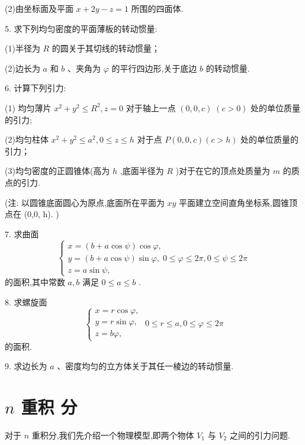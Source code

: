 (2)由坐标面及平面 \(x + {2y} - z = 1\) 所围的四面体.

5. 求下列均匀密度的平面薄板的转动惯量:

(1)半径为 \(R\) 的圆关于其切线的转动惯量；

(2)边长为 \(a\) 和 \(b\) 、夹角为 \(\varphi\) 的平行四边形,关于底边 \(b\) 的转动惯量.

6. 计算下列引力:

(1) 均匀薄片 \({x}^{2} + {y}^{2} \leq  {R}^{2},z = 0\) 对于轴上一点 \(\left( {0,0,c}\right) \;\left( {c > 0}\right)\) 处的单位质量的引力;

(2)均匀柱体 \({x}^{2} + {y}^{2} \leq  {a}^{2},0 \leq  z \leq  h\) 对于点 \(P\left( {0,0,c}\right) \left( {c > h}\right)\) 处的单位质量的引力；

(3)均匀密度的正圆锥体(高为 \(h\) ,底面半径为 \(R\) )对于在它的顶点处质量为 \(m\) 的质点的引力.

(注: 以圆锥底面圆心为原点,底面所在平面为 \({xy}\) 平面建立空间直角坐标系,圆锥顶点在 (0,0, h). )

7. 求曲面
\[
\left\{  \begin{array}{l} x = \left( {b + a\cos \psi }\right) \cos \varphi , \\  y = \left( {b + a\cos \psi }\right) \sin \varphi ,\;0 \leq  \varphi  \leq  {2\pi },0 \leq  \psi  \leq  {2\pi } \\  z = a\sin \psi , \end{array}\right.
\]
的面积,其中常数 \(a,b\) 满足 \(0 \leq  a \leq  b\) .

8. 求螺旋面
\[
\left\{  {\begin{array}{l} x = r\cos \varphi , \\  y = r\sin \varphi , \\  z = {b\varphi }, \end{array}\;0 \leq  r \leq  a,0 \leq  \varphi  \leq  {2\pi }}\right.
\]
的面积.

9. 求边长为 \(a\) 、密度均匀的立方体关于其任一棱边的转动惯量.

\section{\(n\) 重积 分}

对于 \(n\) 重积分,我们先介绍一个物理模型,即两个物体 \({V}_{1}\) 与 \({V}_{2}\) 之间的引力问题.

